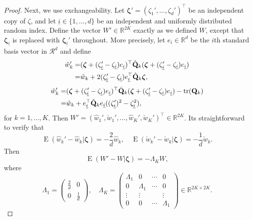 \documentclass[11pt]{article}
\DeclareMathOperator{\mytr}{tr}
\DeclareMathOperator{\myE}{E}
\newcommand{\bfsym}[1]{\ensuremath{\boldsymbol{#1}}}
\def\bzeta{\bfsym {\zeta}}
\theoremstyle{plain}
\theoremstyle{definition}
\theoremstyle{remark}
\begin{document}
\begin{appendices}
\begin{proof}
Next, we use exchangeability.
Let $\bzeta' = (\zeta_1',\ldots, \zeta_d')^\top$ be an independent copy of $\zeta$, and let $\underline i \in \{1,\ldots, d\}$ be an independent and uniformly distributed random index.
Define the vector $W' \in \mathbb R^{2K}$ exactly as we defined $W$, except that $\bzeta_{\underline i}$ is replaced with $\bzeta_{\underline i}'$ throughout.
More precisely, let $e_i \in \mathbb R^d$ be the $i$th standard basis vector in $\mathcal R^d$ and define
\begin{equation*}
\begin{split}
    \hat w_k'=& (\bzeta + (\zeta_{\underline i}' - \zeta_{\underline i}) e_{\underline i})^\top 
    \hat \BQ_k
    (\bzeta + (\zeta_{\underline i}' - \zeta_{\underline i}) e_{\underline i})
\\
=& \hat w_k + 2 (\zeta_{\underline i}' - \zeta_{\underline i}) e_{\underline i}^\top \hat \BQ_k \bzeta,
\end{split}
\end{equation*}
\begin{equation*}
\begin{split}
    \check w_k'=& (\bzeta + (\zeta_{\underline i}' - \zeta_{\underline i}) e_{\underline i})^\top 
    \check \BQ_k
    (\bzeta + (\zeta_{\underline i}' - \zeta_{\underline i}) e_{\underline i})
    -\mytr(\BQ_k)
\\
=& \check w_k +  e_{\underline i}^\top \check \BQ_k e_{\underline i} ((\zeta_{\underline i}')^2 - \zeta_{\underline i}^2) ,
\end{split}
\end{equation*}
for $k=1,\ldots, K$.
Then $W'= (\hat w_1',\check w_1', \ldots, \hat w_K', \check w_K')^\top \in \mathbb R^{2K}$.
Its straightforward to verify that
\begin{equation*}
    \myE (\hat w_k' - \hat w_k|\bzeta)=-\frac{2}{d} \hat w_k,
    \quad
    \myE (\check w_k' - \check w_k|\bzeta)=-\frac{1}{d} \check w_k.
\end{equation*}
Then
\begin{equation*}
    \myE ( W' - W |\bzeta) = - \Lambda_K W,
\end{equation*}
where
\begin{equation*}
    \Lambda_1=
    \begin{pmatrix}
       \frac 2 d & 0\\
       0 & \frac 1 d
    \end{pmatrix}
    ,
    \quad
    \Lambda_K =
    \begin{pmatrix}
        \Lambda_1 & 0 & \cdots & 0\\
         0 &\Lambda_1  & \cdots & 0\\
         \vdots & \vdots && \vdots\\
         0 & 0 & \cdots & \Lambda_1
    \end{pmatrix}
    \in \mathbb R^{2K\times 2K}.
\end{equation*}


\end{proof}
\end{appendices}
\end{document}

